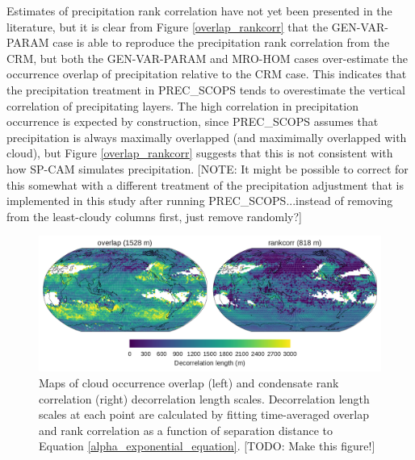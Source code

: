 Estimates of precipitation rank correlation have not yet been presented in the literature, but it is clear from Figure \ref{overlap_rankcorr} that the GEN-VAR-PARAM case is able to reproduce the precipitation rank correlation from the CRM, but both the GEN-VAR-PARAM and MRO-HOM cases over-estimate the occurrence overlap of precipitation relative to the CRM case. This indicates that the precipitation treatment in PREC\_SCOPS tends to overestimate the vertical correlation of precipitating layers. The high correlation in precipitation occurrence is expected by construction, since PREC\_SCOPS assumes that precipitation is always maximally overlapped (and maximimally overlapped with cloud), but Figure \ref{overlap_rankcorr} suggests that this is not consistent with how SP-CAM simulates precipitation. [NOTE: It might be possible to correct for this somewhat with a different treatment of the precipitation adjustment that is implemented in this study after running PREC\_SCOPS...instead of removing from the least-cloudy columns first, just remove randomly?]

\begin{figure}
\centering
\includegraphics[width=\columnwidth]{graphics/subgrid2_overlap_map.pdf}
\caption{Maps of cloud occurrence overlap (left) and condensate rank correlation (right) decorrelation length scales. Decorrelation length scales at each point are calculated by fitting time-averaged overlap and rank correlation as a function of separation distance to Equation \ref{alpha_exponential_equation}. [TODO: Make this figure!]}
\label{sgi_overlap_map}
\end{figure}

